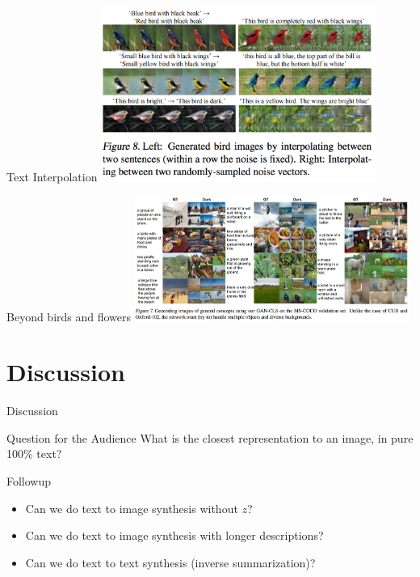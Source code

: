 \documentclass{beamer}
\begin{document}
\begin{frame}{Text Interpolation}
\centering
\includegraphics[width=9cm]{img/reed/result_text_int.png}
\end{frame}


\begin{frame}{Beyond birds and flowers}
\centering
\includegraphics[width=9cm]{img/reed/result_beyond.png}
\end{frame}


\section{Discussion}
\begin{frame}{}
\centering
Discussion
\end{frame}


\begin{frame}{Question for the Audience}
What is the closest representation to an image, in pure 100\% text?
\vskip 0.5cm

\begin{block}{Followup}
\begin{itemize}
\item Can we do text to image synthesis without $z$?
\item Can we do text to image synthesis with longer descriptions?
\item Can we do text to text synthesis (inverse summarization)?
\end{itemize}
\end{block}

\end{frame}
\end{document}
